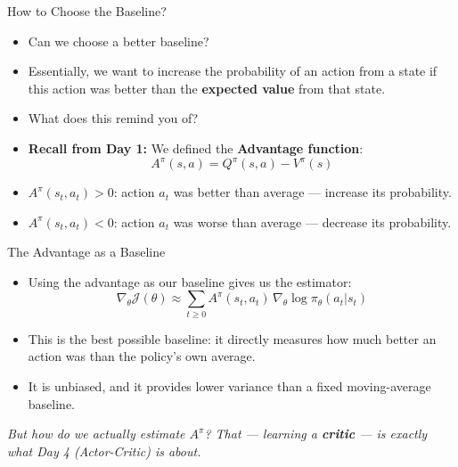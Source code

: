 \begin{frame}{How to Choose the Baseline?}
\begin{itemize}
    \item Can we choose a better baseline?
    \item Essentially, we want to increase the probability of an action from a state if this action was better than the \textbf{expected value} from that state.
    \pause
    \item What does this remind you of?
    \pause
    \item \textbf{Recall from Day 1:} We defined the \textbf{Advantage function}:
    $$A^{\pi}(s,a) = Q^{\pi}(s,a) - V^{\pi}(s)$$
    \item $A^{\pi}(s_t, a_t) > 0$: action $a_t$ was better than average --- increase its probability.
    \item $A^{\pi}(s_t, a_t) < 0$: action $a_t$ was worse than average --- decrease its probability.
\end{itemize}
\end{frame}

\begin{frame}{The Advantage as a Baseline}
\begin{itemize}
    \item Using the advantage as our baseline gives us the estimator:
    $$\nabla_\theta \mathcal{J}(\theta) \approx \sum_{t \geq 0} A^{\pi}(s_t, a_t) \, \nabla_\theta \log \pi_\theta (a_t|s_t) $$
    \item This is the best possible baseline: it directly measures how much better an action was than the policy's own average.
    \item It is unbiased, and it provides lower variance than a fixed moving-average baseline.
\end{itemize}
\vspace{0.5em}
\textit{But how do we actually estimate $A^{\pi}$? That --- learning a \textbf{critic} --- is exactly what Day 4 (Actor-Critic) is about.}
\end{frame}


